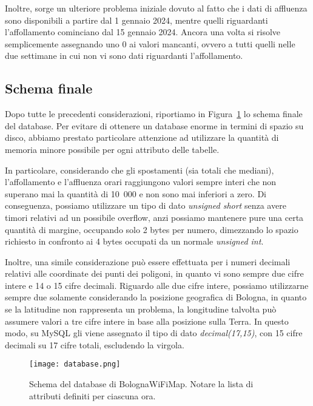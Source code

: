 Inoltre, sorge un ulteriore problema iniziale dovuto al fatto che i dati di affluenza sono disponibili a partire dal 1 gennaio 2024, mentre quelli riguardanti l'affollamento cominciano dal 15 gennaio 2024. Ancora una volta si risolve semplicemente assegnando uno 0 ai valori mancanti, ovvero a tutti quelli nelle due settimane in cui non vi sono dati riguardanti l'affollamento.

\subsection{Schema finale}
Dopo tutte le precedenti considerazioni, riportiamo in Figura~\ref{fig:database} lo schema finale del database. Per evitare di ottenere un database enorme in termini di spazio su disco, abbiamo prestato particolare attenzione ad utilizzare la quantità di memoria minore possibile per ogni attributo delle tabelle.

In particolare, considerando che gli spostamenti (sia totali che mediani), l'affollamento e l'affluenza orari raggiungono valori sempre interi che non superano mai la quantità di 10~000 e non sono mai inferiori a zero. Di conseguenza, possiamo utilizzare un tipo di dato \textit{unsigned short} senza avere timori relativi ad un possibile overflow, anzi possiamo mantenere pure una certa quantità di margine, occupando solo 2 bytes per numero, dimezzando lo spazio richiesto in confronto ai 4 bytes occupati da un normale \textit{unsigned int}.

Inoltre, una simile considerazione può essere effettuata per i numeri decimali relativi alle coordinate dei punti dei poligoni, in quanto vi sono sempre due cifre intere e 14 o 15 cifre decimali. Riguardo alle due cifre intere, possiamo utilizzarne sempre due solamente considerando la posizione geografica di Bologna, in quanto se la latitudine non rappresenta un problema, la longitudine talvolta può assumere valori a tre cifre intere in base alla posizione sulla Terra. In questo modo, su MySQL gli viene assegnato il tipo di dato \textit{decimal(17,15)}, con 15 cifre decimali su 17 cifre totali, escludendo la virgola.

\begin{figure}[H]
    \centering
    \texttt{[image: database.png]}
    \caption[Schema del database]{Schema del database di BolognaWiFiMap. Notare la lista di attributi definiti per ciascuna ora.}
    \label{fig:database}
\end{figure}

